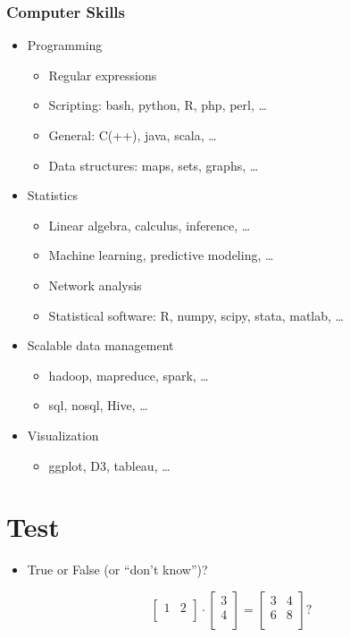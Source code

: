 \documentclass[mathserif, xcolor=table, svgnames]{beamer}
\begin{document}
\begin{frame}
  \frametitle{Computer Skills}
  \begin{itemize}
  \item Programming
    \begin{itemize}
    \item Regular expressions
    \item Scripting: bash, python, R, php, perl, \dots
    \item General: C(++), java, scala, \dots
    \item Data structures: maps, sets, graphs, \dots
    \end{itemize}
  \item Statistics
    \begin{itemize}
    \item \alert{Linear algebra, calculus, inference}, \dots
    \item \alert{Machine learning, predictive modeling}, \dots
    \item Network analysis
    \item Statistical software: R, \alert{numpy, scipy}, stata, matlab, \dots
    \end{itemize}
  \item Scalable data management
    \begin{itemize}
    \item hadoop, mapreduce, spark, \dots
    \item sql, nosql, Hive, \dots
    \end{itemize}
  \item Visualization
    \begin{itemize}
    \item ggplot, D3, tableau, \dots
    \end{itemize}
  \end{itemize}
\end{frame}


\section{Test}

\begin{frame}
  \begin{itemize}
  \item True or False (or ``don't know'')?
  \end{itemize}
  \begin{equation*}
    \begin{bmatrix}
      1 & 2\\
    \end{bmatrix}
    \cdot
    \begin{bmatrix}
      3 \\ 4\\
    \end{bmatrix}
    = 
    \begin{bmatrix}
      3 & 4 \\
      6 & 8 \\
    \end{bmatrix}?
  \end{equation*}
\end{frame}
\end{document}
